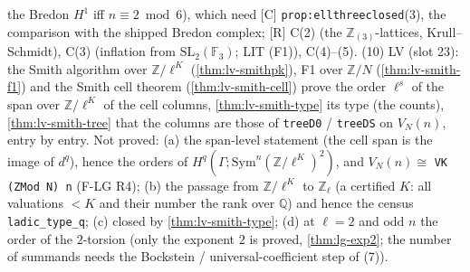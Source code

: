 \begin{remark}
  the Bredon $H^1$ iff $n\equiv2\bmod6$), which need [C] \texttt{prop:ellthreeclosed}(3), the comparison with the shipped Bredon
  complex; [R] C(2) (the $\mathbb Z_{(3)}$-lattices, Krull--Schmidt), C(3) (inflation from $\mathrm{SL}_2(\mathbb F_3)$; LIT (F1)), C(4)--(5).
  (10) LV (slot 23): the Smith algorithm over $\mathbb Z/\ell^K$ (\ref{thm:lv-smithpk}), F1 over $\mathbb Z/N$ (\ref{thm:lv-smith-f1})
  and the Smith cell theorem (\ref{thm:lv-smith-cell}) prove the order $\ell^s$ of the span over $\mathbb Z/\ell^K$ of the cell columns, \ref{thm:lv-smith-type}
  its type (the counts), \ref{thm:lv-smith-tree} that the columns are those of \texttt{treeD0} / \texttt{treeDS} on $V_N(n)$, entry by
  entry.  Not proved: (a) the span-level statement (the cell span is the image of $d^q$), hence the orders of
  $H^q(\Gamma;\mathrm{Sym}^n(\mathbb Z/\ell^K)^2)$, and $V_N(n)\cong$ \texttt{VK (ZMod N) n} (F-LG R4);
  (b) the passage from $\mathbb Z/\ell^K$ to $\mathbb Z_\ell$ (a certified $K$: all valuations $<K$ and their number the rank over
  $\mathbb Q$) and hence the census \texttt{ladic\_type\_q}; (c) closed by \ref{thm:lv-smith-type}; (d) at $\ell=2$ and
  odd $n$ the order of the $2$-torsion (only the exponent $2$ is proved, \ref{thm:lg-exp2}; the number of summands needs the
  Bockstein / universal-coefficient step of (7)).
\end{remark}

